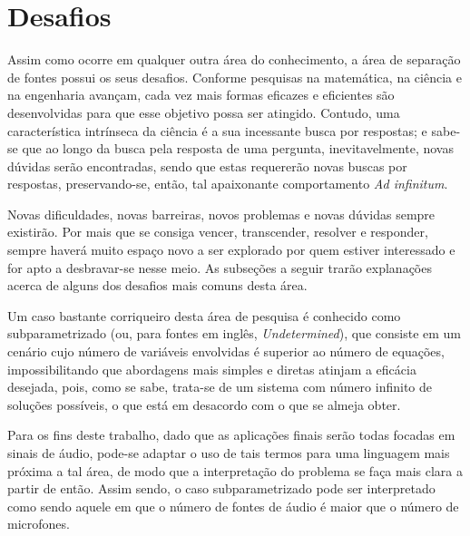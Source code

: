 


\section{Desafios}
\label{sec:intro_challenges}

Assim como ocorre em qualquer outra área do conhecimento, a área de separação de fontes possui os seus desafios. Conforme pesquisas na matemática, na ciência e na engenharia avançam, cada vez mais formas eficazes e eficientes são desenvolvidas para que esse objetivo possa ser atingido. Contudo, uma característica intrínseca da ciência é a sua incessante busca por respostas; e sabe-se que ao longo da busca pela resposta de uma pergunta, inevitavelmente, novas dúvidas serão encontradas, sendo que estas requererão novas buscas por respostas, preservando-se, então, tal apaixonante comportamento \textit{Ad infinitum}.

Novas dificuldades, novas barreiras, novos problemas e novas dúvidas sempre existirão. Por mais que se consiga vencer, transcender, resolver e responder, sempre haverá muito espaço novo a ser explorado por quem estiver interessado e for apto a desbravar-se nesse meio. As subseções a seguir trarão explanações acerca de alguns dos desafios mais comuns desta área.




Um caso bastante corriqueiro desta área de pesquisa é conhecido como subparametrizado (ou, para fontes em inglês, \textit{Undetermined}), que consiste em um cenário cujo número de variáveis envolvidas é superior ao número de equações, impossibilitando que abordagens mais simples e diretas atinjam a eficácia desejada, pois, como se sabe, trata-se de um sistema com número infinito de soluções possíveis, o que está em desacordo com o que se almeja obter.

Para os fins deste trabalho, dado que as aplicações finais serão todas focadas em sinais de áudio, pode-se adaptar o uso de tais termos para uma linguagem mais próxima a tal área, de modo que a interpretação do problema se faça mais clara a partir de então. Assim sendo, o caso subparametrizado pode ser interpretado como sendo aquele em que o número de fontes de áudio é maior que o número de microfones.

